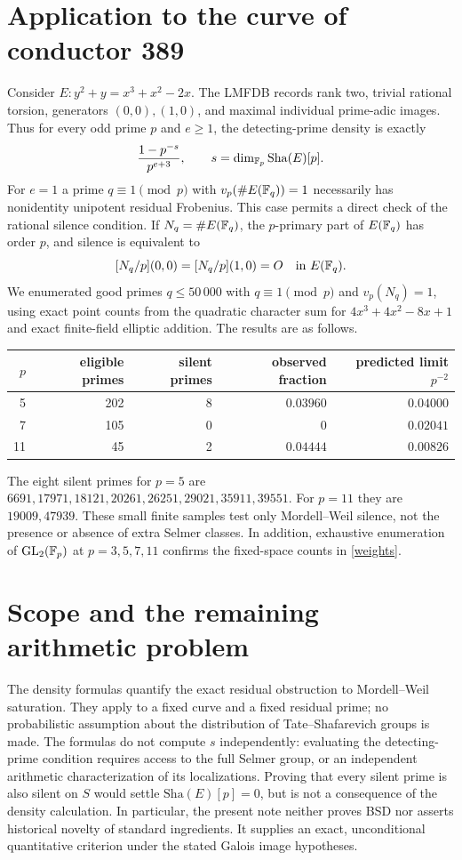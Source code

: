 \documentclass[11pt]{article}
\theoremstyle{remark}\newtheorem{remark}[theorem]{Remark}
\newcommand{\Sha}{\mathop{\text{\fontencoding{U}\fontfamily{wncy}\selectfont\symbol{88}}}}
\renewcommand{\Sha}{\mathrm{Sha}}
\begin{document}
\section{Application to the curve of conductor 389}
Consider $E:y^2+y=x^3+x^2-2x$. The LMFDB \cite{LMFDB} records rank two, trivial rational torsion, generators $(0,0),(1,0)$, and maximal individual prime-adic images. Thus for every odd prime $p$ and $e\geq1$, the detecting-prime density is exactly
\[
 \frac{1-p^{-s}}{p^{e+3}},\qquad s=\dim_{\F_p}\Sha(E)[p].
\]
For $e=1$ a prime $q\equiv1\pmod p$ with $v_p(\#E(\mathbb F_q))=1$ necessarily has nonidentity unipotent residual Frobenius. This case permits a direct check of the rational silence condition. If $N_q=\#E(\mathbb F_q)$, the $p$-primary part of $E(\mathbb F_q)$ has order $p$, and silence is equivalent to
\[
 [N_q/p](0,0)=[N_q/p](1,0)=O\quad\text{in }E(\mathbb F_q).
\]
We enumerated good primes $q\leq50\,000$ with $q\equiv1\pmod p$ and $v_p(N_q)=1$, using exact point counts from the quadratic character sum for $4x^3+4x^2-8x+1$ and exact finite-field elliptic addition. The results are as follows.
\begin{center}
\begin{tabular}{rrrrr}
\toprule
$p$ & eligible primes & silent primes & observed fraction & predicted limit $p^{-2}$\\
\midrule
5 & 202 & 8 & $0.03960$ & $0.04000$\\
7 & 105 & 0 & $0$ & $0.02041$\\
11 & 45 & 2 & $0.04444$ & $0.00826$\\
\bottomrule
\end{tabular}
\end{center}
The eight silent primes for $p=5$ are $6691,17971,18121,20261,26251,29021,35911,39551$. For $p=11$ they are $19009,47939$. These small finite samples test only Mordell--Weil silence, not the presence or absence of extra Selmer classes. In addition, exhaustive enumeration of $\operatorname{GL}_2(\mathbb F_p)$ at $p=3,5,7,11$ confirms the fixed-space counts in \eqref{weights}.

\section{Scope and the remaining arithmetic problem}
The density formulas quantify the exact residual obstruction to Mordell--Weil saturation. They apply to a fixed curve and a fixed residual prime; no probabilistic assumption about the distribution of Tate--Shafarevich groups is made. The formulas do not compute $s$ independently: evaluating the detecting-prime condition requires access to the full Selmer group, or an independent arithmetic characterization of its localizations. Proving that every silent prime is also silent on $S$ would settle $\Sha(E)[p]=0$, but is not a consequence of the density calculation. In particular, the present note neither proves BSD nor asserts historical novelty of standard ingredients. It supplies an exact, unconditional quantitative criterion under the stated Galois image hypotheses.
\end{document}
